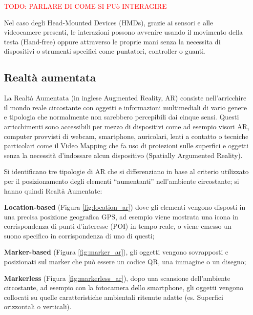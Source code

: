 \textcolor{red}{TODO: PARLARE DI COME SI PUò INTERAGIRE}

Nel caso degli Head-Mounted Devices (HMDs), grazie ai sensori e alle videocamere presenti, le interazioni possono avvenire usando il movimento della testa (Hand-free) oppure attraverso le proprie mani senza la necessita di dispositivi o strumenti specifici come puntatori, controller o guanti.

\subsection{Realtà aumentata}
La Realtà Aumentata (in inglese Augmented Reality, AR) consiste nell'arricchire il mondo reale circostante con oggetti e informazioni multimediali di vario genere e tipologia che normalmente non sarebbero percepibili dai cinque sensi.%
Questi arricchimenti sono accessibili per mezzo di dispositivi come ad esempio visori AR, computer provvisti di webcam, smartphone, auricolari, lenti a contatto o tecniche particolari come il Video Mapping che fa uso di proiezioni sulle superfici e oggetti senza la necessità d'indossare alcun dispositivo (Spatially Argumented Reality\cite{Raskar1999SpatiallyAR}).

Si identificano tre tipologie di AR che si differenziano in base al criterio utilizzato per il posizionamento degli elementi \enquote{aumentanti} nell'ambiente circostante; si hanno quindi Realtà Aumentate:

\begin{description}
    \item \textbf{Location-based} (Figura \ref{fig:location_ar}) dove gli elementi vengono disposti in una precisa posizione geografica GPS, ad esempio viene mostrata una icona in corrispondenza di punti d'interesse (POI) in tempo reale, o viene emesso un suono specifico in corrispondenza di uno di questi;
    \item \textbf{Marker-based} (Figura \ref{fig:marker_ar}), gli oggetti vengono sovrapposti e posizionati sul marker che può essere un codice QR, una immagine o un disegno;
    \item \textbf{Markerless} (Figura \ref{fig:markerless_ar}), dopo una scansione dell'ambiente circostante, ad esempio con la fotocamera dello smartphone, gli oggetti vengono collocati su quelle caratteristiche ambientali ritenute adatte (es. Superfici orizzontali o verticali).
\end{description}

